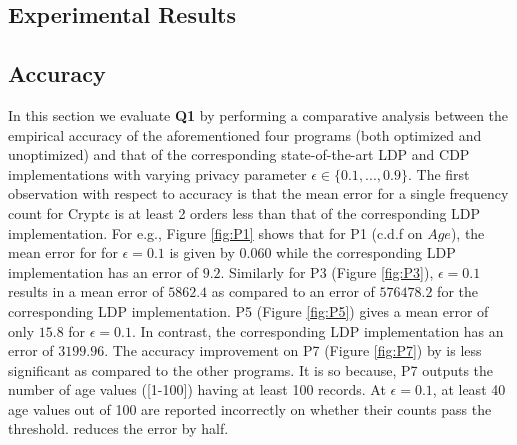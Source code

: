 \subsection{Experimental Results}\label{exp:results}
\subsection*{Accuracy}
In this section we evaluate \textbf{Q1} by performing a comparative analysis between the empirical accuracy of the aforementioned four \system programs (both optimized and unoptimized) and that of the corresponding state-of-the-art \textsf{LDP} \cite{LDP1} and \textsf{CDP} \cite{Dork} implementations  with varying privacy parameter $\epsilon \in \{0.1,...,0.9\}$. %
The first observation with respect to accuracy is that the mean error for a single frequency count for Crypt$\epsilon$ is at least 2 orders less than that of the corresponding \textsf{LDP} implementation.   For e.g., Figure \ref{fig:P1} shows that for P1 (c.d.f on $Age$), the mean error for \system for $\epsilon=0.1$ is given by $0.060$ while the corresponding \textsf{LDP} implementation has an error of $9.2$. Similarly for P3 (Figure \ref{fig:P3}),  $\epsilon=0.1$ results in a mean error of $5862.4$ as compared to an error of $576478.2$ for the corresponding \textsf{LDP} implementation. P5 (Figure \ref{fig:P5}) gives a mean error of only $15.8$ for $\epsilon=0.1$. In contrast, the corresponding \textsf{LDP} implementation has an error of $3199.96$.   The accuracy
improvement on P7 (Figure \ref{fig:P7}) by \system is less significant as compared to the other programs. It is so because, P7 outputs the number of age values ([1-100]) having at least
100 records. At $\epsilon=0.1$, at least 40 age values out of 100 are
reported incorrectly on whether their counts pass the threshold. \system reduces the error by half. 


